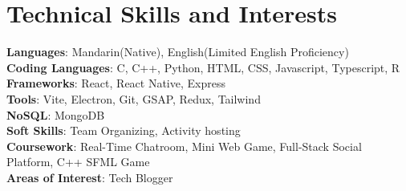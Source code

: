 \documentclass[a4paper,11pt]{article}
\begin{document}
\section{\textbf{Technical Skills and Interests}}
 \begin{itemize}[leftmargin=0.05in, label={}]
    \small{\item{
     \textbf{Languages}{: Mandarin(Native), English(Limited English Proficiency)} \\
     \textbf{Coding Languages}{: C, C++, Python, HTML, CSS, Javascript, Typescript, R} \\
     \textbf{Frameworks}{: React, React Native, Express} \\
     \textbf{Tools}{: Vite, Electron, Git, GSAP, Redux, Tailwind} \\
     \textbf{NoSQL}{: MongoDB} \\
     \textbf{Soft Skills}{: Team Organizing, Activity hosting} \\
     \textbf{Coursework}{: Real-Time Chatroom, Mini Web Game, Full-Stack Social Platform, C++ SFML Game} \\
     \textbf{Areas of Interest}{: Tech Blogger} \\
    }}
 \end{itemize}
 \vspace{-16pt}


\end{document}
